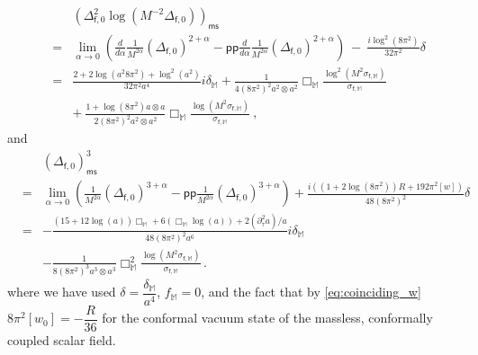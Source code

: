 \documentclass[12pt]{book}
\newcommand{\pp}{\mathsf{pp}}
\newcommand{\ms}{\mathsf{ms}}
\newcommand{\Mbb}{\mathbb{M}}
\newcommand{\fsf}{\mathsf{f}}
\theoremstyle{break}
\begin{document}
%
\begin{eqnarray*}
&& \left(\Delta^2_{\fsf,0} \log\left(M^{-2} \Delta_{\fsf,0}\right)\right)_\ms \\
&=& \lim_{\alpha\to 0}\left(\frac{d}{d\alpha}\frac{1}{M^{2\alpha}}(\Delta_{\fsf,0})^{2+\alpha}-\pp\frac{d}{d\alpha}\frac{1}{M^{2\alpha}}(\Delta_{\fsf,0})^{2+\alpha}\right) \ - \ \frac{i\log^2(8\pi^2)}{32\pi^2}\delta \\
%
&=& \frac{2+2\log (a^2 8\pi^2)+\log^2 (a^2)}{32\pi^2 a^4}i\delta_\mathbb{M}+\frac{1}{4(8\pi^2)^2 a^2\otimes a^2}\Box_{\mathbb{M}}\frac{\log^2\left(M^2\sigma_{\fsf,\mathbb{M}}\right)}{\sigma_{\fsf,\mathbb{M}}}\\
%
&& + \ \frac{1+\log(8\pi^2) a\otimes a}{2(8\pi^2)^2 a^2\otimes a^2}\Box_{\mathbb{M}}\frac{\log\left(M^2\sigma_{\fsf,\mathbb{M}}\right)}{\sigma_{\fsf,\mathbb{M}}} \ ,
\end{eqnarray*}
%
and
%
\begin{eqnarray*}
&& (\Delta_{\fsf,0})^3_\ms \\ 
&=& \lim_{\alpha\to 0}\left(\frac{1}{M^{2\alpha}}(\Delta_{\fsf,0})^{3+\alpha}-\pp\frac{1}{M^{2\alpha}}(\Delta_{\fsf,0})^{3+\alpha}\right)+\frac{i\left((1+2\log(8\pi^2))R+192\pi^2[w]\right)}{48(8\pi^2)^2}\delta\\
%
&=&-\frac{(15+12\log (a))\Box_\mathbb{M}+6(\Box_\mathbb{M} \log (a))+2(\partial^2_\tau a)/a}{48(8\pi^2)^2a^6}i\delta_\mathbb{M} \\ 
&& - \frac{1}{8(8\pi^2)^3 a^3\otimes a^3}\Box^2_{\mathbb{M}}\frac{\log\left(M^2\sigma_{\fsf,\mathbb{M}}\right)}{\sigma_{\fsf,\mathbb{M}}}\,.
\end{eqnarray*}
%
where we have used $\delta = \dfrac{\delta_{\Mbb}}{a^4}$, $f_{\Mbb}=0$, and the fact that by \eqref{eq:coinciding_w} $8\pi^2[w_0]=-\dfrac{R}{36}$ for the conformal vacuum state of the massless, conformally coupled scalar field. 
\end{document}
